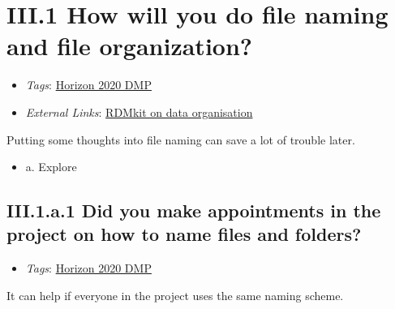 \documentclass[a4paper,12pt]{report}
\begin{document}
\section*{\protect\textcolor{colorSecId}{III.1} How will you do file naming and file organization?}

\label{b1df3c74-0b1f-4574-81c4-4cc2d780c1af.8e886b55-3287-48e7-b353-daf6ab40f7d8}


\begin{itemize}
  \item \textit{Tags}: \ul{Horizon 2020 DMP}
  
  \item \textit{External Links}: \href{https://rdmkit.elixir-europe.org/data_organisation.html}{RDMkit on data organisation}\end{itemize}


\noindent
\begin{markdown}
Putting some thoughts into file naming can save a lot of trouble later. 
\end{markdown}



\begin{itemize}
  \item[\CheckmarkBold] a. Explore
\end{itemize}




\subsection*{\protect\textcolor{colorSecId}{III.1.a.1} Did you make appointments in the project on how to name files and folders?}

\label{b1df3c74-0b1f-4574-81c4-4cc2d780c1af.8e886b55-3287-48e7-b353-daf6ab40f7d8.c05f27a2-30ac-44fd-9ac9-cd6f62b16d0c.d4fe0b55-4aee-4d05-88d4-a3f4cad2cfa9}


\begin{itemize}
  \item \textit{Tags}: \ul{Horizon 2020 DMP}
  \end{itemize}


\noindent
\begin{markdown}
It can help if everyone in the project uses the same naming scheme.
\end{markdown}
\end{document}
